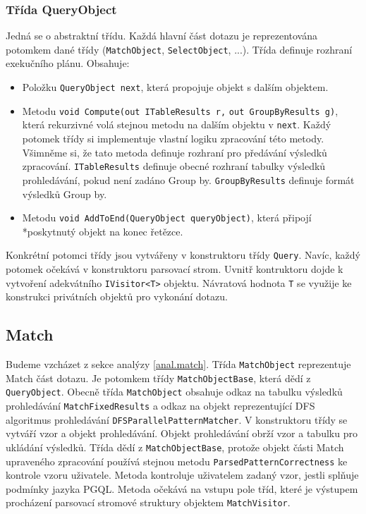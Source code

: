 \subsubsection{Třída QueryObject}

Jedná se o abstraktní třídu.
Každá hlavní část dotazu je reprezentována potomkem dané třídy (\texttt{MatchObject}, \texttt{SelectObject}, ...).
Třída definuje rozhraní exekučního plánu.
Obsahuje:
\begin{itemize}
\item Položku \texttt{QueryObject next}, která propojuje objekt s dalším objektem.
\item Metodu \texttt{void Compute(out ITableResults r,} \texttt{out GroupByResults g)}, která rekurzivné volá stejnou metodu na dalším objektu v \texttt{next}.
Každý potomek třídy si implementuje vlastní logiku zpracování této metody.
Všimněme si, že tato metoda definuje rozhraní pro předávání výsledků zpracování.
\texttt{ITableResults} definuje obecné rozhraní tabulky výsledků prohledávání, pokud není zadáno Group by.
\texttt{GroupByResults} definuje formát výsledků Group by.
\item Metodu \texttt{void AddToEnd(QueryObject queryObject)}, která připojí \\*poskytnutý objekt na konec řetězce.
\end{itemize}
Konkrétní potomci třídy jsou vytvářeny v konstruktoru třídy \texttt{Query}.
Navíc, každý potomek očekává v konstruktoru parsovací strom.
Uvnitř kontruktoru dojde k vytvoření adekvátního \texttt{IVisitor<T>} objektu.
Návratová hodnota \texttt{T} se využije ke konstrukci privátních objektů pro vykonání dotazu.

\subsection{Match}

Budeme vzcházet z sekce analýzy \ref{anal.match}.
Třída \texttt{MatchObject} reprezentuje Match část dotazu.
Je potomkem třídy \texttt{MatchObjectBase}, která dědí z \texttt{QueryObject}.
Obecně třída \texttt{MatchObject} obsahuje odkaz na tabulku výsledků prohledávání \texttt{MatchFixedResults} a odkaz na objekt reprezentující DFS algoritmus prohledávání \texttt{DFSParallelPatternMatcher}.
V konstruktoru třídy se vytváří vzor a objekt prohledávání.
Objekt prohledávání obrží vzor a tabulku pro ukládání výsledků.
Třída dědí z \texttt{MatchObjectBase}, protože objekt části Match upraveného zpracování používá stejnou metodu \texttt{ParsedPatternCorrectness} ke kontrole vzoru uživatele.
Metoda kontroluje uživatelem zadaný vzor, jestli splňuje podmínky jazyka PGQL. 
Metoda očekává na vstupu pole tříd, které je výstupem procházení parsovací stromové struktury objektem \texttt{MatchVisitor}. 


